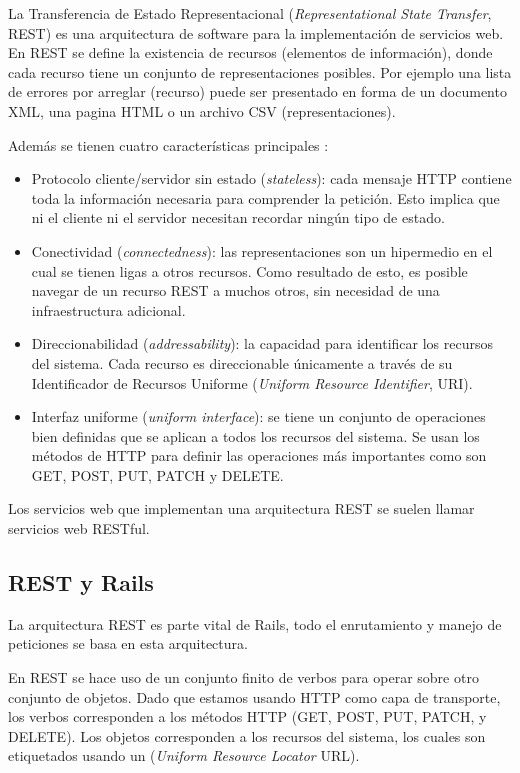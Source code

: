 La Transferencia de Estado Representacional (\textit{Representational State Transfer}, REST) es una arquitectura de software para la implementación de servicios web.
En REST se define la existencia de recursos (elementos de información), donde
cada recurso tiene un conjunto de representaciones posibles.
Por ejemplo una lista de errores por arreglar (recurso) puede ser presentado en
forma de un documento XML, una pagina HTML o un archivo CSV (representaciones).

\vspace{2.5mm}

Además se tienen cuatro características principales \cite{1_richardson_2007}:

\begin{itemize}
\item Protocolo cliente/servidor sin estado (\textit{stateless}): cada mensaje
  HTTP contiene toda la información necesaria para comprender la petición.
  Esto implica que ni el cliente ni el servidor necesitan recordar ningún
  tipo de estado.
\item Conectividad (\textit{connectedness}): las representaciones son un hipermedio
  en el cual se tienen ligas a otros recursos. Como resultado de esto, es posible
  navegar de un recurso REST a muchos otros, sin necesidad de una
  infraestructura adicional.
\item Direccionabilidad (\textit{addressability}): la capacidad para
  identificar los recursos del sistema. Cada recurso es direccionable únicamente
  a través de su Identificador de Recursos Uniforme (\textit{Uniform Resource Identifier}, URI).
\item Interfaz uniforme (\textit{uniform interface}): se tiene un conjunto de
  operaciones bien definidas que se aplican a todos los recursos del sistema.
  Se usan los métodos de HTTP para definir las operaciones más importantes
  como son GET, POST, PUT, PATCH y DELETE.
\end{itemize}

Los servicios web que implementan una arquitectura REST se suelen llamar
servicios web RESTful.

\subsection{REST y Rails}

La arquitectura REST es parte vital de Rails, todo el enrutamiento y
manejo de peticiones se basa en esta arquitectura.

En REST se hace uso de un conjunto finito de verbos para operar sobre otro
conjunto de objetos. Dado que estamos usando HTTP como capa de transporte, los
verbos corresponden a los métodos HTTP (GET, POST, PUT, PATCH, y DELETE).
Los objetos corresponden a los recursos del sistema, los cuales son etiquetados
usando un (\textit{Uniform Resource Locator} URL).

